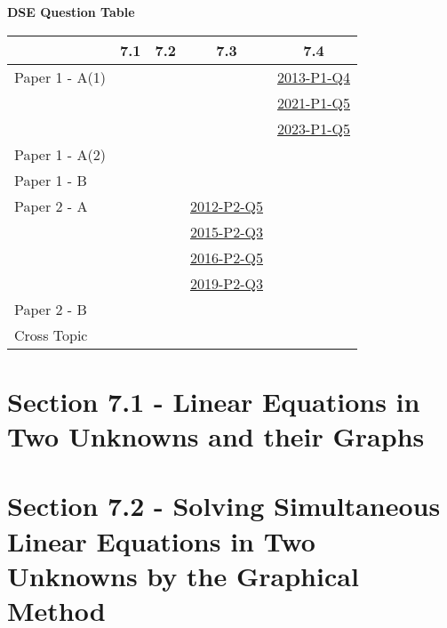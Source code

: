 \documentclass[12pt, a4paper]{article}
\begin{document}
\begin{absolutelynopagebreak}
\begin{center}
\textbf{DSE Question Table}
\end{center}
\begin{center}
\begin{tabular}{|l|c|c|c|c|}
\hline
        & 7.1 & 7.2 & 7.3 & 7.4 \\\hline
\hline
Paper 1 - A(1)&  &  &  & \hyperref[DSE2013-CoreP1-Q04]{2013-P1-Q4} \\
&  &  &  & \hyperref[DSE2021-CoreP1-Q05]{2021-P1-Q5} \\
&  &  &  & \hyperref[DSE2023-CoreP1-Q05]{2023-P1-Q5} \\
\hline
Paper 1 - A(2)&  &  &  &  \\
\hline
Paper 1 - B&  &  &  &  \\
\hline
\hline
Paper 2 - A&  &  & \hyperref[DSE2012-CoreP2-Q05]{2012-P2-Q5} &  \\
&  &  & \hyperref[DSE2015-CoreP2-Q03]{2015-P2-Q3} &  \\
&  &  & \hyperref[DSE2016-CoreP2-Q05]{2016-P2-Q5} &  \\
&  &  & \hyperref[DSE2019-CoreP2-Q03]{2019-P2-Q3} &  \\
\hline
Paper 2 - B&  &  &  &  \\
\hline
\hline
Cross Topic&  &  &  &  \\
\hline
\end{tabular}
\end{center}
\end{absolutelynopagebreak}




\section*{Section 7.1 - Linear Equations in Two Unknowns and their Graphs}\label{section:2-7-1}





\section*{Section 7.2 - Solving Simultaneous Linear Equations in Two Unknowns by the Graphical Method}\label{section:2-7-2}
\end{document}
